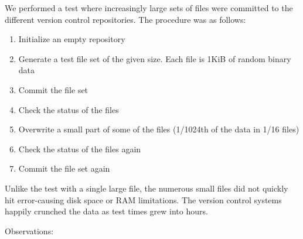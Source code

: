 \documentclass[a4paper]{article}
\begin{document}
\iffalse

We performed a test where increasingly large sets of files were committed to the
different version control repositories. The procedure was as follows:

\begin{enumerate}
    \setlength{\itemsep}{0pt}
    \setlength{\parskip}{0pt}
    \setlength{\parsep}{0pt}
    \item Initialize an empty repository
    \item Generate a test file set of the given size. Each file is 1KiB of
        random binary data
    \item Commit the file set
    \item Check the status of the files
    \item Overwrite a small part of some of the files (1/1024th of the data in
        1/16 files)
    \item Check the status of the files again
    \item Commit the file set again
\end{enumerate}

Unlike the test with a single large file, the numerous small files did not
quickly hit error-causing disk space or RAM limitations. The version control
systems happily crunched the data as test times grew into hours.

Observations:
\end{document}

